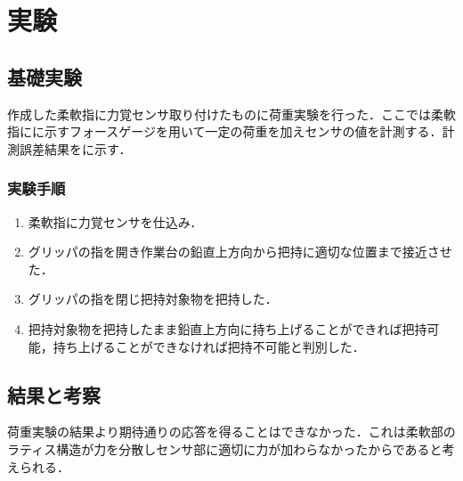 \section{実験}
\subsection{基礎実験}
作成した柔軟指に力覚センサ取り付けたものに荷重実験を行った．ここでは柔軟指にに示すフォースゲージを用いて一定の荷重を加えセンサの値を計測する．計測誤差結果をに示す．

\subsubsection{実験手順}
\begin{enumerate}
  \item 柔軟指に力覚センサを仕込み．  
  \item グリッパの指を開き作業台の鉛直上方向から把持に適切な位置まで接近させた． 
  \item グリッパの指を閉じ把持対象物を把持した．
  \item 把持対象物を把持したまま鉛直上方向に持ち上げることができれば把持可能，持ち上げることができなければ把持不可能と判別した．
\end{enumerate}

\subsection{結果と考察}
荷重実験の結果より期待通りの応答を得ることはできなかった．これは柔軟部のラティス構造が力を分散しセンサ部に適切に力が加わらなかったからであると考えられる．










\newpage



